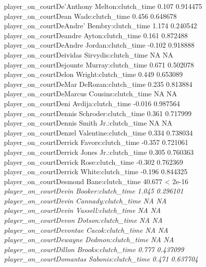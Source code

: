\documentclass[
  landscape]{article}
\begin{document}
{player\_on\_courtDe'Anthony Melton:clutch\_time 0.107 0.914475\\
player\_on\_courtDean Wade:clutch\_time 0.456 0.648678\\
player\_on\_courtDeAndre' Bembry:clutch\_time 1.174 0.240542\\
player\_on\_courtDeandre Ayton:clutch\_time 0.161 0.872488\\
player\_on\_courtDeAndre Jordan:clutch\_time -0.102 0.918888\\
player\_on\_courtDeividas Sirvydis:clutch\_time NA NA\\
player\_on\_courtDejounte Murray:clutch\_time 0.671 0.502078\\
player\_on\_courtDelon Wright:clutch\_time 0.449 0.653089\\
player\_on\_courtDeMar DeRozan:clutch\_time 0.235 0.813884\\
player\_on\_courtDeMarcus Cousins:clutch\_time NA NA\\
player\_on\_courtDeni Avdija:clutch\_time -0.016 0.987564\\
player\_on\_courtDennis Schroder:clutch\_time 0.361 0.717999\\
player\_on\_courtDennis Smith Jr.:clutch\_time NA NA\\
player\_on\_courtDenzel Valentine:clutch\_time 0.334 0.738034\\
player\_on\_courtDerrick Favors:clutch\_time -0.357 0.721061\\
player\_on\_courtDerrick Jones Jr.:clutch\_time 0.305 0.760363\\
player\_on\_courtDerrick Rose:clutch\_time -0.302 0.762369\\
player\_on\_courtDerrick White:clutch\_time -0.196 0.844325\\
player\_on\_courtDesmond Bane:clutch\_time 40.677 \textless{} 2e-16
}\emph{ player\_on\_courtDevin Booker:clutch\_time 1.045 0.296101\\
player\_on\_courtDevin Cannady:clutch\_time NA NA\\
player\_on\_courtDevin Vassell:clutch\_time NA NA\\
player\_on\_courtDevon Dotson:clutch\_time NA NA\\
player\_on\_courtDevontae Cacok:clutch\_time NA NA\\
player\_on\_courtDewayne Dedmon:clutch\_time NA NA\\
player\_on\_courtDillon Brooks:clutch\_time 0.777 0.437099\\
player\_on\_courtDomantas Sabonis:clutch\_time 0.471 0.637704\\
}
\end{document}
